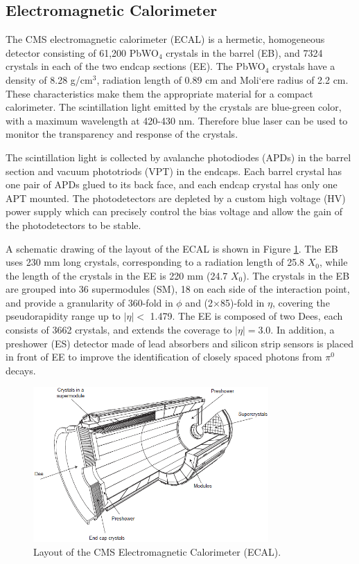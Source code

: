 \documentclass[thesis.tex]{subfiles}
\begin{document}
\subsection{Electromagnetic Calorimeter}
The CMS electromagnetic calorimeter (ECAL) is a hermetic, homogeneous detector consisting of 61,200 PbWO$_4$ crystals in the barrel (EB), and 7324 crystals in each of the two endcap sections (EE). 
The PbWO$_4$ crystals have a density of 8.28 g/cm$^3$, radiation length of 0.89 cm and Moli`ere radius of 2.2 cm. 
These characteristics make them the appropriate material for a compact calorimeter. 
The scintillation light emitted by the crystals are blue-green color, with a maximum wavelength at 420-430 nm. 
Therefore blue laser can be used to monitor the transparency and response of the crystals. 

The scintillation light is collected by avalanche photodiodes (APDs) in the barrel section and vacuum phototriods (VPT) in the endcaps. 
Each barrel crystal has one pair of APDs glued to its back face, and each endcap crystal has only one APT mounted. 
The photodetectors are depleted by a custom high voltage (HV) power supply which can precisely control the bias voltage and allow the gain of the photodetectors to be stable. 

A schematic drawing of the layout of the ECAL is shown in Figure \ref{fig:ecalall}. 
The EB uses 230 mm long crystals, corresponding to a radiation length of 25.8 $X_0$, while the length of the crystals in the EE is 220 mm (24.7 $X_0$). 
The crystals in the EB are grouped into 36 supermodules (SM), 18 on each side of the interaction point, and provide a granularity of 360-fold in $\phi$ and (2$\times$85)-fold in $\eta$, covering the pseudorapidity range up to $|\eta| <$ 1.479. 
The EE is composed of two Dees, each consists of 3662 crystals, and extends the coverage to $|\eta| = $3.0. 
In addition, a preshower (ES) detector made of lead absorbers and silicon strip sensors is placed in front of EE to improve the identification of closely spaced photons from $\pi^0$ decays. 

\begin{figure}[hbtp]
	\centering
	\includegraphics[width=0.8\textwidth]{Fig/The-CMS-Electromagnetic-Calorimeter-ECAL-The-barrel-section-comprises-36.png}
	\caption{Layout of the CMS Electromagnetic Calorimeter (ECAL).}
	\label{fig:ecalall}
\end{figure}
\end{document}
